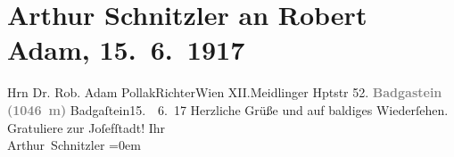 

         
         \renewcommand{\erwaehntePersonen}{Personen: Robert Adam}
         \renewcommand{\erwaehnteInstitutionen}{Institutionen: Bezirksgericht Wien Josefstadt}
         \renewcommand{\erwaehnteOrte}{Orte: Bad Gastein, Meidlinger Hauptstraße, Wien, XII., Meidling}
         \renewcommand{\erwaehnteWerke}{}
               \section[Arthur Schnitzler an Robert Adam, 15. 6. 1917]{ Arthur Schnitzler an Robert Adam, 15. 6. 1917}\nopagebreak{}\rehead{ }\begin{ledgroupsized}[t]{13cm}\normalsize\beginnumbering \toendnotes[C]{\smallbreak\pagebreak[2]} 
\toendnotes[C]{\smallbreak}\pstart{}{\pb}Hrn Dr. Rob. Adam Pollak\pend{}\pstart{}Richter\pend{}\pstart{}Wien XII.\pend{}\pstart{}Meidlinger Hptstr 52. \pend{}{\bigskip}\pstart
           \noindent{}\centering{}{\pb}\textcolor{gray}{\textbf{Badgastein (1046 m)}}\pend
           \pstart
           \raggedleft{}{\pb}Badgaſtein15.  6. 17\pend
           \pstart
           Herzliche Grüße und auf baldiges Wiederſehen. Gratuliere zur Joſefſtadt!\pend
           \pstart
           Ihr{\\[\baselineskip]}\spacefill\mbox{Arthur Schnitzler}\pend
           \leftskip=0em{}
         
         \endnumbering{}\end{ledgroupsized}  \newcommand{\dateiname}{L02263}\newcommand{\titel}{Arthur Schnitzler an Robert Adam, 15. 6. 1917}\newcommand{\editorInnen}{Martin Anton Müller und Gerd-Hermann Susen}
      